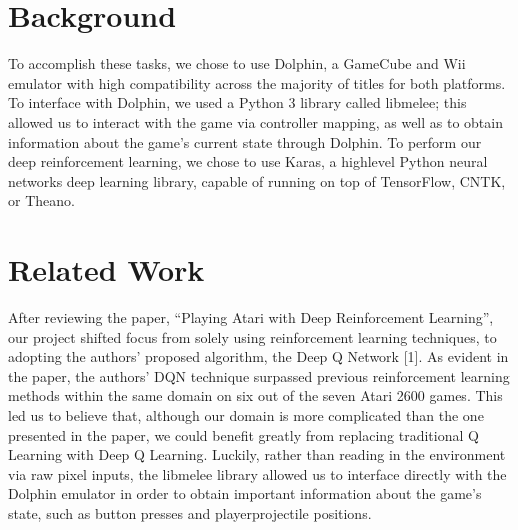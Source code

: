 \documentclass{article}
\begin{document}
\section{Background}
To accomplish these tasks, we chose to use Dolphin, a GameCube and Wii emulator with high compatibility across the majority of titles 
for both platforms. To interface with Dolphin, we used a Python 3 library called libmelee; this allowed us to interact with the game 
via controller mapping, as well as to obtain information about the game’s current state through Dolphin. To perform our deep reinforcement 
learning, we chose to use Karas, a high\-level Python neural networks deep learning library, capable of running on top of TensorFlow, CNTK, or Theano.
\section{Related Work}
After reviewing the paper, “Playing Atari with Deep Reinforcement Learning”, our project shifted focus from solely using reinforcement learning 
techniques, to adopting the authors’ proposed algorithm, the Deep Q Network [1]. As evident in the paper, the authors’ DQN technique surpassed 
previous reinforcement learning methods within the same domain on six out of the seven Atari 2600 games. This led us to believe that, although 
our domain is more complicated than the one presented in the paper, we could benefit greatly from replacing traditional Q Learning with Deep Q Learning. 
Luckily, rather than reading in the environment via raw pixel inputs, the libmelee library allowed us to interface directly with the Dolphin emulator 
in order to obtain important information about the game’s state, such as button presses and player\/projectile positions.
\end{document}
